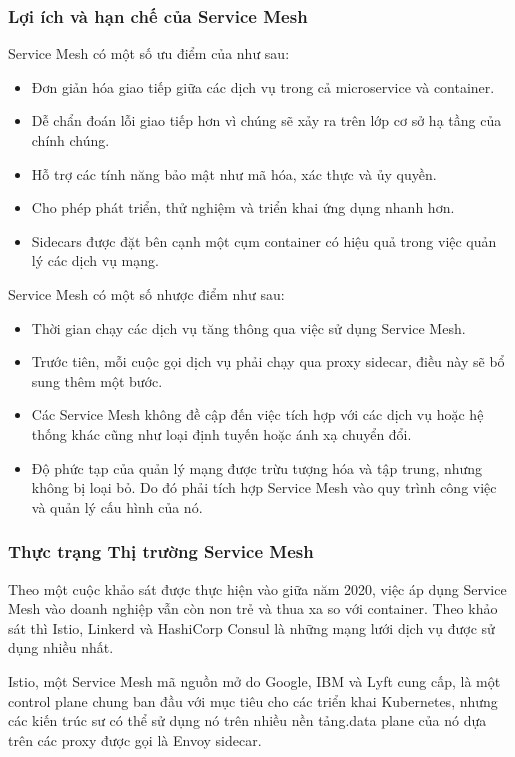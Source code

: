 \documentclass[14pt,a4paper]{book}
\begin{document}
			\subsubsection{Lợi ích và hạn chế của Service Mesh}
		\hspace{0.6cm}Service Mesh có một số ưu điểm của như sau:
		\begin{itemize}
			\item Đơn giản hóa giao tiếp giữa các dịch vụ trong cả microservice và container.
			\item Dễ chẩn đoán lỗi giao tiếp hơn vì chúng sẽ xảy ra trên lớp cơ sở hạ tầng của chính chúng.
			\item Hỗ trợ các tính năng bảo mật như mã hóa, xác thực và ủy quyền.
			\item Cho phép phát triển, thử nghiệm và triển khai ứng dụng nhanh hơn.
			\item Sidecars được đặt bên cạnh một cụm container có hiệu quả trong việc quản lý các dịch vụ mạng.
		\end{itemize}
		
		Service Mesh có một số nhược điểm như sau:
		\begin{itemize}
			\item Thời gian chạy các dịch vụ tăng thông qua việc sử dụng Service Mesh.
			\item Trước tiên, mỗi cuộc gọi dịch vụ phải chạy qua proxy sidecar, điều này sẽ bổ sung thêm một bước.
			\item Các Service Mesh không đề cập đến việc tích hợp với các dịch vụ hoặc hệ thống khác cũng như loại định tuyến hoặc ánh xạ chuyển đổi.
			\item Độ phức tạp của quản lý mạng được trừu tượng hóa và tập trung, nhưng không bị loại bỏ. Do đó phải tích hợp Service Mesh vào quy trình công việc và quản lý cấu hình của nó.
		\end{itemize}
		
			\subsubsection{Thực trạng Thị trường Service Mesh}
		\hspace{0.6cm}Theo một cuộc khảo sát được thực hiện vào giữa năm 2020, việc áp dụng Service Mesh vào doanh nghiệp vẫn còn non trẻ và thua xa so với container. Theo khảo sát thì Istio, Linkerd và HashiCorp Consul là những mạng lưới dịch vụ được sử dụng nhiều nhất.
		
		Istio, một Service Mesh mã nguồn mở do Google, IBM và Lyft cung cấp, là một control plane chung ban đầu với mục tiêu cho các triển khai Kubernetes, nhưng các kiến trúc sư có thể sử dụng nó trên nhiều nền tảng.data plane của nó dựa trên các proxy được gọi là Envoy sidecar.
		
\end{document}
